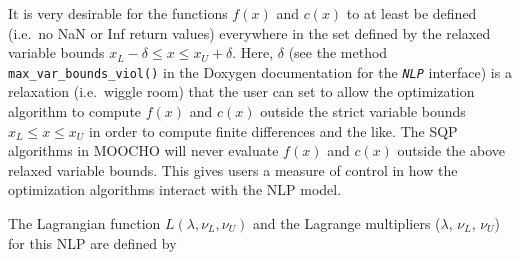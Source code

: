 \documentclass[pdf,ps2pdf,11pt]{SANDreport}
\begin{document}
It is very desirable for the functions $f(x)$ and $c(x)$ to at least
be defined (i.e.~no NaN or Inf return values) everywhere in the set
defined by the relaxed variable bounds $x_L - \delta \leq x \leq x_U +
\delta$.  Here, $\delta$ (see the method
\texttt{max\_var\_bounds\_viol()} in the Doxygen documentation for the
\texttt{\textit{NLP}} interface) is a relaxation (i.e.~wiggle room)
that the user can set to allow the optimization algorithm to compute
$f(x)$ and $c(x)$ outside the strict variable bounds $x_L \le x \le
x_U$ in order to compute finite differences and the like.  The SQP
algorithms in MOOCHO will never evaluate $f(x)$ and $c(x)$ outside the
above relaxed variable bounds.  This gives users a measure of control
in how the optimization algorithms interact with the NLP model.

%
%

The Lagrangian function $L(\lambda, \nu_L, \nu_U)$ and the Lagrange multipliers ($\lambda$, $\nu_L$, $\nu_U$) for this
NLP are defined by
\end{document}
